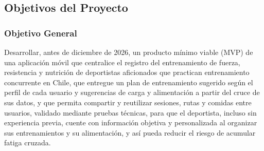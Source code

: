 \subsection{Objetivos del Proyecto}
\subsubsection{Objetivo General}
Desarrollar, antes de diciembre de 2026, un producto mínimo viable (MVP) de una aplicación móvil que centralice el registro del entrenamiento de fuerza, resistencia y nutrición de deportistas aficionados que practican entrenamiento concurrente en Chile, que entregue un plan de entrenamiento sugerido según el perfil de cada usuario y sugerencias de carga y alimentación a partir del cruce de sus datos, y que permita compartir y reutilizar sesiones, rutas y comidas entre usuarios, validado mediante pruebas técnicas, para que el deportista, incluso sin experiencia previa, cuente con información objetiva y personalizada al organizar sus entrenamientos y su alimentación, y así pueda reducir el riesgo de acumular fatiga cruzada.
\newpage
